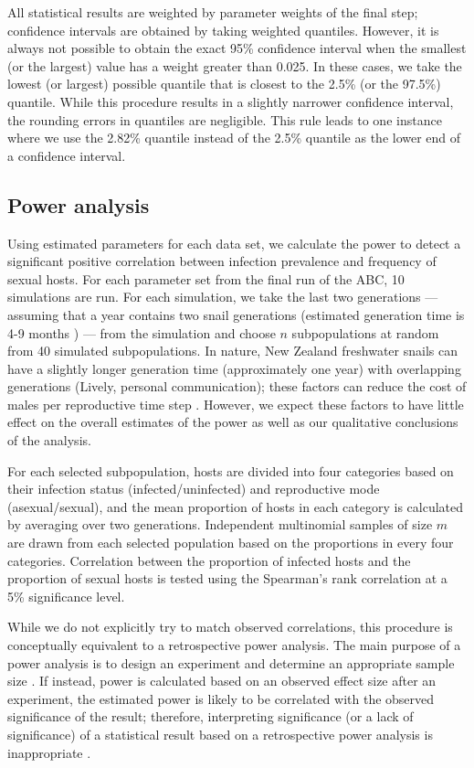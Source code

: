 \documentclass{article}\usepackage[]{graphicx}\usepackage[]{color}
\begin{document}
All statistical results are weighted by parameter weights of the final step; 
confidence intervals are obtained by taking weighted quantiles. 
However, it is always not possible to obtain the exact 95\% confidence interval when the smallest (or the largest) value has a weight greater than 0.025. 
In these cases, we take the lowest (or largest) possible quantile that is closest to the 2.5\% (or the 97.5\%) quantile.
While this procedure results in a slightly narrower confidence interval, the rounding errors in quantiles are negligible. 
This rule leads to one instance where we use the 2.82\% quantile instead of the 2.5\% quantile as the lower end of a confidence interval.

\subsection{Power analysis}

Using estimated parameters for each data set, we calculate the power to detect a significant positive correlation between infection prevalence and frequency of sexual hosts.
For each parameter set from the final run of the ABC, 10 simulations are run.
For each simulation, we take the last two generations --- assuming that a year contains two snail generations (estimated generation time is 4-9 months \citep{neiman2005variation}) --- from the simulation and choose $n$ subpopulations at random from 40 simulated subpopulations.
In nature, New Zealand freshwater snails can have a slightly longer generation 
time (approximately one year) with overlapping generations (Lively, personal communication);
these factors can reduce the cost of males per reproductive time step \citep{lively2010parasite}.
However, we expect these factors to have little effect on the overall estimates of the power
as well as our qualitative conclusions of the analysis.

For each selected subpopulation, hosts are divided into four categories based on their infection status (infected/uninfected) and reproductive mode (asexual/sexual),
and the mean proportion of hosts in each category is calculated by averaging over two generations.
Independent multinomial samples of size $m$ are drawn from each selected population based on the proportions in every four categories. 
Correlation between the proportion of infected hosts and the proportion of sexual hosts is tested using the Spearman's rank correlation at a 5\% significance level.

While we do not explicitly try to match observed correlations, this procedure is conceptually equivalent to a retrospective power analysis.
The main purpose of a power analysis is to design an experiment and determine an appropriate sample size \citep{cohen1992statistical}.
If instead, power is calculated based on an observed effect size after an experiment, the estimated power is likely to be correlated with the observed significance of the result;
therefore, interpreting significance (or a lack of significance) of a statistical result based on a retrospective power analysis is inappropriate \citep{goodman1994use, senn2002power}.
\end{document}
